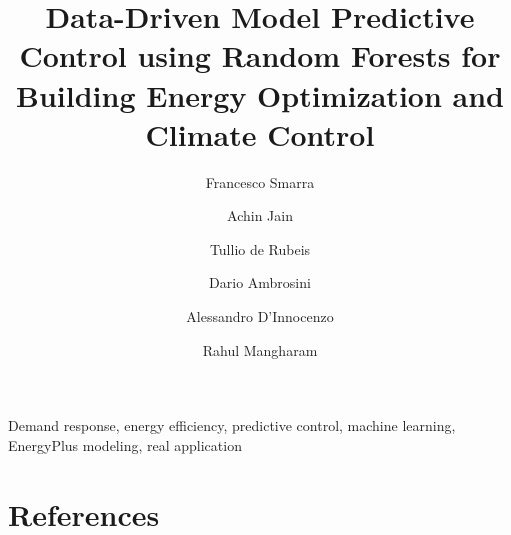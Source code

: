 \documentclass[review]{elsarticle}
\begin{document}
\begin{frontmatter}

\title{\textcolor[rgb]{0,0,1}{Data-Driven Model Predictive Control using Random Forests for Building Energy Optimization and Climate Control}}

\author[FSaddress,EC]{Francesco Smarra}

\author[AJaddress,EC]{Achin Jain}
\author[TDRaddress,EC]{Tullio de Rubeis}
\author[TDRaddress]{Dario Ambrosini}
\author[FSaddress]{Alessandro D'Innocenzo}
\author[AJaddress]{Rahul Mangharam}


\address[FSaddress]{Department of Information Engineering, Computer Science and Mathematics, Universit\`{a} degli Studi dell'Aquila, L'Aquila, Italy}
\address[AJaddress]{Department of Electrical and Systems Engineering, University of Pennsylvania, Philadelphia, USA}
\address[TDRaddress]{"G. Parolini Lab" - Department of Industrial and Information Engineering and Economics, Universit\`{a} degli Studi dell'Aquila, L'Aquila, Italy}


\begin{abstract}

\end{abstract}

\begin{keyword}
Demand response, energy efficiency, predictive control, machine learning, EnergyPlus modeling, real application
\end{keyword}

\end{frontmatter}
















\appendix


\section*{References}


\end{document}
